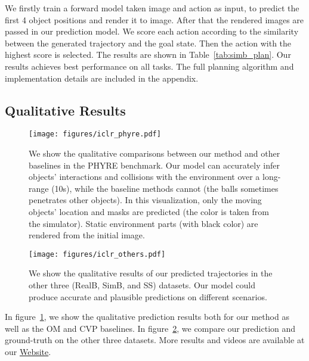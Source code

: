 \documentclass{article} \usepackage{iclr2021_conference,times}
\begin{document}
We firstly train a forward model taken image and action as input, to predict the first 4 object positions and render it to image. After that the rendered images are passed in our prediction model. We score each action according to the similarity between the generated trajectory and the goal state. Then the action with the highest score is selected. The results are shown in Table~\ref{tab:simb_plan}. Our results achieves best performance on all tasks. The full planning algorithm and implementation details are included in the appendix.

\vspace{-0.5em}
\subsection{Qualitative Results}
\vspace{-0.5em}

\begin{figure}[t]
{
\centering
\texttt{[image: figures/iclr\_phyre.pdf]}
\vspace{-1.3em}
\caption{We show the qualitative comparisons between our method and other baselines in the PHYRE benchmark. Our model can accurately infer objects' interactions and collisions with the environment over a long-range (10s), while the baseline methods cannot (the balls sometimes penetrates other objects). In this visualization, only the moving objects' location and masks are predicted (the color is taken from the simulator). Static environment parts (with black color) are rendered from the initial image.}
\label{fig:rst_phyre}
}
\end{figure}

\begin{figure}[t]
{
\centering
\texttt{[image: figures/iclr\_others.pdf]}
\vspace{-0.9em}
\caption{We show the qualitative results of our predicted trajectories in the other three (RealB, SimB, and SS) datasets. Our model could produce accurate and plausible predictions on different scenarios.}
\label{fig:rst_others}
\vspace{-1em}
}
\end{figure}

In figure~\ref{fig:rst_phyre}, we show the qualitative prediction results both for our method as well as the OM and CVP baselines. In figure~\ref{fig:rst_others}, we compare our prediction and ground-truth on the other three datasets. More results and videos are available at our \href{https://haozhiqi.github.io/RPIN}{Website}.
\end{document}
